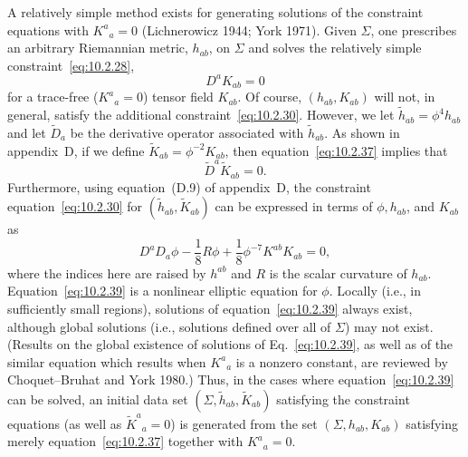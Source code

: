 A relatively simple method exists for generating solutions of the constraint equations
with \(K^a{}_a=0\) (Lichnerowicz 1944; York 1971). Given \(\Sigma\), one prescribes
an arbitrary Riemannian metric, \(h_{ab}\), on \(\Sigma\) and solves the relatively
simple constraint~\eqref{eq:10.2.28},
\begin{equation}
  D^aK_{ab}=0
  \tag{10.2.37}\label{eq:10.2.37}
\end{equation}
for a trace-free (\(K^a{}_a=0\)) tensor field \(K_{ab}\). Of course,
\((h_{ab},K_{ab})\) will not, in general, satisfy the additional
constraint~\eqref{eq:10.2.30}. However, we let \(\widetilde h_{ab}=\phi^4h_{ab}\)
and let \(\widetilde D_a\) be the derivative operator associated with
\(\widetilde h_{ab}\). As shown in appendix~D, if we define
\(\widetilde K_{ab}=\phi^{-2}K_{ab}\), then equation~\eqref{eq:10.2.37} implies that
\begin{equation}
  \widetilde D^a\widetilde K_{ab}=0.
  \tag{10.2.38}\label{eq:10.2.38}
\end{equation}
Furthermore, using equation~(D.9) of appendix~D, the constraint
equation~\eqref{eq:10.2.30} for \((\widetilde h_{ab},\widetilde K_{ab})\) can be
expressed in terms of \(\phi,h_{ab}\), and \(K_{ab}\) as
\begin{equation}
  D^aD_a\phi-\frac18R\phi+\frac18\phi^{-7}K^{ab}K_{ab}=0,
  \tag{10.2.39}\label{eq:10.2.39}
\end{equation}
where the indices here are raised by \(h^{ab}\) and \(R\) is the scalar curvature of
\(h_{ab}\). Equation~\eqref{eq:10.2.39} is a nonlinear elliptic equation for \(\phi\).
Locally (i.e., in sufficiently small regions), solutions of
equation~\eqref{eq:10.2.39} always exist, although global solutions (i.e., solutions
defined over all of \(\Sigma\)) may not exist. (Results on the global existence of
solutions of Eq.~\eqref{eq:10.2.39}, as well as of the similar equation which results
when \(K^a{}_a\) is a nonzero constant, are reviewed by Choquet--Bruhat and York
1980.) Thus, in the cases where equation~\eqref{eq:10.2.39} can be solved, an initial
data set \((\Sigma,\widetilde h_{ab},\widetilde K_{ab})\) satisfying the constraint
equations (as well as \(\widetilde K^a{}_a=0\)) is generated from the set
\((\Sigma,h_{ab},K_{ab})\) satisfying merely equation~\eqref{eq:10.2.37} together
with \(K^a{}_a=0\).

